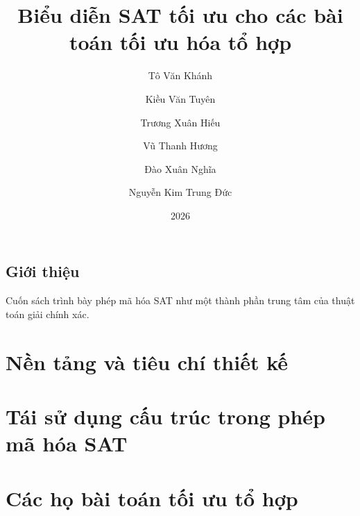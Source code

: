 \documentclass[11pt,a4paper]{book}
\title{Biểu diễn SAT tối ưu cho các bài toán tối ưu hóa tổ hợp}
\author{Tô Văn Khánh \and Kiều Văn Tuyên \and Trương Xuân Hiếu \and Vũ Thanh Hương \and Đào Xuân Nghĩa \and Nguyễn Kim Trung Đức}
\date{2026}
\theoremstyle{satplain}
\theoremstyle{definition}
\begin{document}
\frontmatter
\maketitle

\chapter*{Giới thiệu}
Cuốn sách trình bày phép mã hóa SAT như một thành phần trung tâm của thuật toán giải chính xác.

\mainmatter
\part{Nền tảng và tiêu chí thiết kế}





\part{Tái sử dụng cấu trúc trong phép mã hóa SAT}




\part{Các họ bài toán tối ưu tổ hợp}







\backmatter
\end{document}
